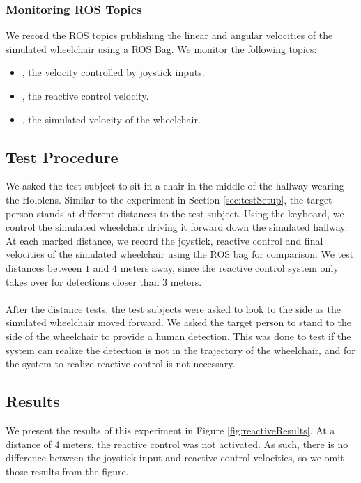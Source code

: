 \subsubsection{Monitoring ROS Topics}
We record the ROS topics publishing the linear and angular velocities of the simulated wheelchair using a ROS Bag. We monitor the following topics:

\begin{itemize}
	\item {}, the velocity controlled by joystick inputs.
	\item {}, the reactive control velocity.
	\item {}, the simulated velocity of the wheelchair.
\end{itemize}

\subsection{Test Procedure}
We asked the test subject to sit in a chair in the middle of the hallway wearing the Hololens. Similar to the experiment in Section \ref{sec:testSetup}, the target person stands at different distances to the test subject. Using the keyboard, we control the simulated wheelchair driving it forward down the simulated hallway. At each marked distance, we  record the joystick, reactive control and final velocities of the simulated wheelchair using the ROS bag for comparison. We test distances between $1$ and $4$ meters away, since the reactive control system only takes over for detections closer than $3$ meters. 

\paragraph{}After the distance tests, the test subjects were asked to look to the side as the simulated wheelchair moved forward. We asked the target person to stand to the side of the wheelchair to provide a human detection. This was done to test if the system can realize the detection is not in the trajectory of the wheelchair, and for the system to realize reactive control is not necessary.

\subsection{Results}
We present the results of this experiment in Figure \ref{fig:reactiveResults}. At a distance of 4 meters, the reactive control was not activated. As such, there is no difference between the joystick input and reactive control velocities, so we omit those results from the figure.

